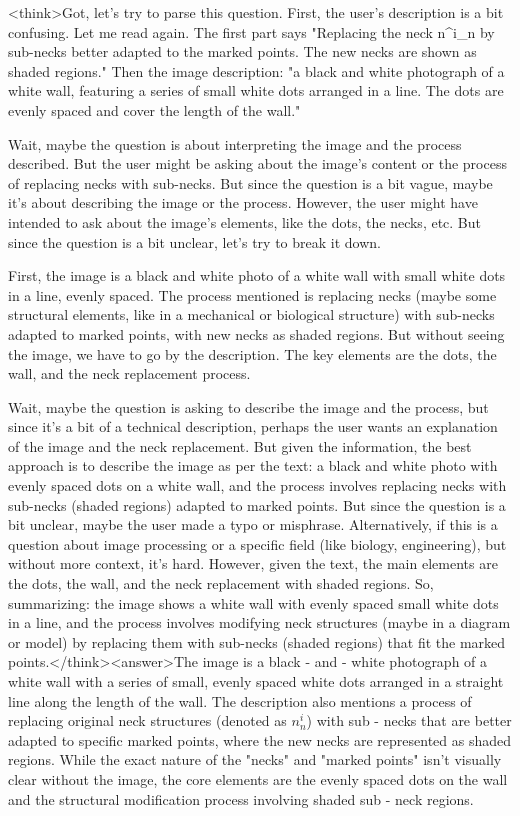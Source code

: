 <think>Got, let's try to parse this question. First, the user's description is a bit confusing. Let me read again. The first part says "Replacing the neck n^i_n by sub-necks better adapted to the marked points. The new necks are shown as shaded regions." Then the image description: "a black and white photograph of a white wall, featuring a series of small white dots arranged in a line. The dots are evenly spaced and cover the length of the wall." 

Wait, maybe the question is about interpreting the image and the process described. But the user might be asking about the image's content or the process of replacing necks with sub-necks. But since the question is a bit vague, maybe it's about describing the image or the process. However, the user might have intended to ask about the image's elements, like the dots, the necks, etc. But since the question is a bit unclear, let's try to break it down.

First, the image is a black and white photo of a white wall with small white dots in a line, evenly spaced. The process mentioned is replacing necks (maybe some structural elements, like in a mechanical or biological structure) with sub-necks adapted to marked points, with new necks as shaded regions. But without seeing the image, we have to go by the description. The key elements are the dots, the wall, and the neck replacement process. 

Wait, maybe the question is asking to describe the image and the process, but since it's a bit of a technical description, perhaps the user wants an explanation of the image and the neck replacement. But given the information, the best approach is to describe the image as per the text: a black and white photo with evenly spaced dots on a white wall, and the process involves replacing necks with sub-necks (shaded regions) adapted to marked points. But since the question is a bit unclear, maybe the user made a typo or misphrase. Alternatively, if this is a question about image processing or a specific field (like biology, engineering), but without more context, it's hard. However, given the text, the main elements are the dots, the wall, and the neck replacement with shaded regions. So, summarizing: the image shows a white wall with evenly spaced small white dots in a line, and the process involves modifying neck structures (maybe in a diagram or model) by replacing them with sub-necks (shaded regions) that fit the marked points.</think><answer>The image is a black - and - white photograph of a white wall with a series of small, evenly spaced white dots arranged in a straight line along the length of the wall. The description also mentions a process of replacing original neck structures (denoted as \(n^{i}_{n}\)) with sub - necks that are better adapted to specific marked points, where the new necks are represented as shaded regions. While the exact nature of the "necks" and "marked points" isn't visually clear without the image, the core elements are the evenly spaced dots on the wall and the structural modification process involving shaded sub - neck regions.  

